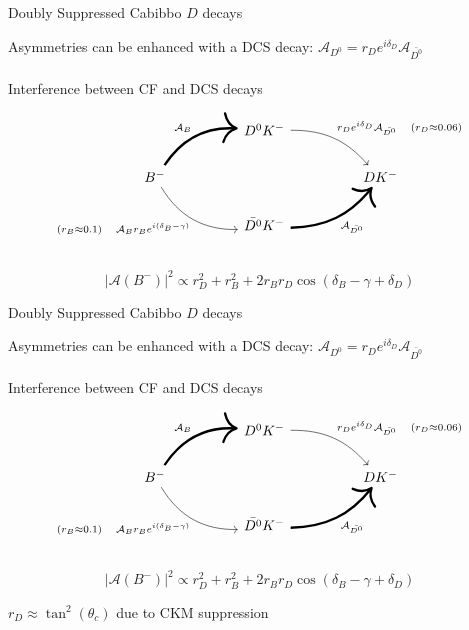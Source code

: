 \documentclass[dvipsnames]{beamer}
\begin{document}
\begin{frame}[fragile]{Doubly Suppressed Cabibbo $D$ decays}
  \begin{center}
    Asymmetries can be enhanced with a DCS decay: $\mathcal{A}_{D^0} = r_De^{i\delta_D}\mathcal{A}_{\bar{D^0}}$\\~\\
    Interference between CF and DCS decays
  \end{center}
  \begin{equation*}
    \begin{tikzcd}[column sep=huge]
      & D^0K^- \arrow[dr, bend left = 25, "r_De^{i\delta_D}\mathcal{A}_{\bar{D^0}}\quad (r_D\approx0.06)"] & \\
      B^- \arrow[ur, bend left, line width = 1.7, "\mathcal{A}_B"] \arrow[dr, bend right, "(r_B\approx0.1)\quad\mathcal{A}_B r_B e^{i(\delta_B - \gamma)}"'] & [5cm] & DK^- \\
      & \bar{D^0}K^- \arrow[ur, bend right = 25, line width = 1.7, "\mathcal{A}_{\bar{D^0}}"'] & \\
    \end{tikzcd}
  \end{equation*}
  \begin{equation*}
    \lvert\mathcal{A}(B^-)\lvert^2\propto r_D^2 + r_B^2 + 2r_Br_D\cos(\delta_B - \gamma + \delta_D)
  \end{equation*}
  \begin{center}
    \phantom{Almost 4-fold degeneracy since $\delta_D\approx180^\circ()$}
  \end{center}
\end{frame}

\begin{frame}[fragile]{Doubly Suppressed Cabibbo $D$ decays}
  \begin{center}
    Asymmetries can be enhanced with a DCS decay: $\mathcal{A}_{D^0} = r_De^{i\delta_D}\mathcal{A}_{\bar{D^0}}$\\~\\
    Interference between CF and DCS decays
  \end{center}
  \begin{equation*}
    \begin{tikzcd}[column sep=huge]
      & D^0K^- \arrow[dr, bend left = 25, "r_De^{i\delta_D}\mathcal{A}_{\bar{D^0}}\quad (r_D\approx0.06)"] & \\
      B^- \arrow[ur, bend left, line width = 1.7, "\mathcal{A}_B"] \arrow[dr, bend right, "(r_B\approx0.1)\quad\mathcal{A}_B r_B e^{i(\delta_B - \gamma)}"'] & [5cm] & DK^- \\
      & \bar{D^0}K^- \arrow[ur, bend right = 25, line width = 1.7, "\mathcal{A}_{\bar{D^0}}"'] & \\
    \end{tikzcd}
  \end{equation*}
  \begin{equation*}
    \lvert\mathcal{A}(B^-)\lvert^2\propto r_D^2 + r_B^2 + 2r_Br_D\cos(\delta_B - \gamma + \delta_D)
  \end{equation*}
  \begin{center}
    $r_D\approx\tan^2(\theta_c)$ due to CKM suppression
  \end{center}
\end{frame}
\end{document}
